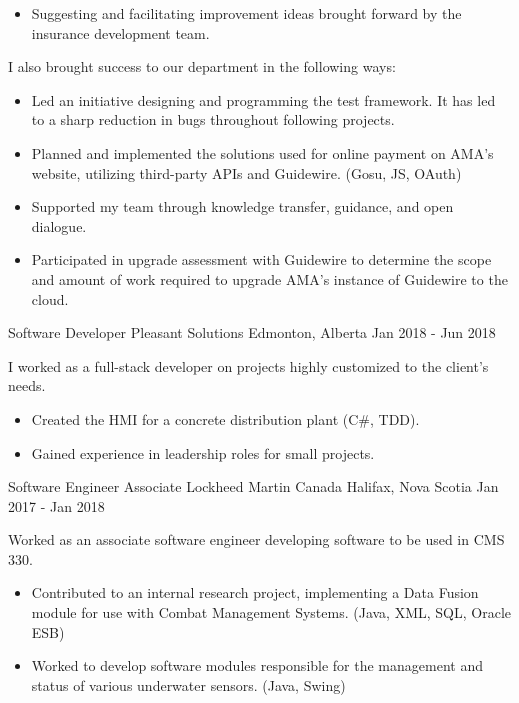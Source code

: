 \begin{cventries}
{\begin{itemize}
                \item Suggesting and facilitating improvement ideas brought forward by the insurance development team.
            \end{itemize}
            I also brought success to our department in the following ways:
            \begin{itemize}
                \item Led an initiative designing and programming the test framework.  It has led to a sharp reduction in bugs throughout following projects.
                \item Planned and implemented the solutions used for online payment on AMA’s website, utilizing third-party APIs and Guidewire. (Gosu, JS, OAuth)
                \item Supported my team through knowledge transfer, guidance, and open dialogue.
                \item Participated in upgrade assessment with Guidewire to determine the scope and amount of work required to upgrade AMA's instance of Guidewire to the cloud.
            \end{itemize}
        }
    \cventry
        {Software Developer}
        {Pleasant Solutions}
        {Edmonton, Alberta}
        {Jan 2018 - Jun 2018}
        {
            I worked as a full-stack developer on projects highly customized to the client’s needs.
            \begin{itemize}
                \item Created the HMI for a concrete distribution plant (C\#, TDD).
                \item Gained experience in leadership roles for small projects.
            \end{itemize}
        }
    \cventry
        {Software Engineer Associate}
        {Lockheed Martin Canada}
        {Halifax, Nova Scotia}
        {Jan 2017 - Jan 2018}
        {
            Worked as an associate software engineer developing software to be used in CMS 330.
            \begin{itemize}
                \item Contributed to an internal research project, implementing a Data Fusion module for use with Combat Management Systems. (Java, XML, SQL, Oracle ESB)
                \item Worked to develop software modules responsible for the management and status of various underwater sensors. (Java, Swing)

\end{itemize}}
\end{cventries}
